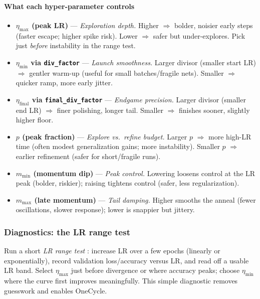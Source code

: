 \begin{enrichment}
	\paragraph{What each hyper-parameter controls}
	\begin{itemize}
		\item \textbf{$\eta_{\text{max}}$ (peak LR)} — \emph{Exploration depth.} Higher $\Rightarrow$ bolder, noisier early steps (faster escape; higher spike risk). Lower $\Rightarrow$ safer but under-explores. Pick just \emph{before} instability in the range test.
		\item \textbf{$\eta_{\text{min}}$ via \texttt{div\_factor}} — \emph{Launch smoothness.} Larger divisor (smaller start LR) $\Rightarrow$ gentler warm-up (useful for small batches/fragile nets). Smaller $\Rightarrow$ quicker ramp, more early jitter.
		\item \textbf{$\eta_{\text{final}}$ via \texttt{final\_div\_factor}} — \emph{Endgame precision.} Larger divisor (smaller end LR) $\Rightarrow$ finer polishing, longer tail. Smaller $\Rightarrow$ finishes sooner, slightly higher floor.
		\item \textbf{$p$ (peak fraction)} — \emph{Explore vs.\ refine budget.} Larger $p$ $\Rightarrow$ more high-LR time (often modest generalization gains; more instability). Smaller $p$ $\Rightarrow$ earlier refinement (safer for short/fragile runs).
		\item \textbf{$m_{\text{min}}$ (momentum dip)} — \emph{Peak control.} Lowering loosens control at the LR peak (bolder, riskier); raising tightens control (safer, less regularization).
		\item \textbf{$m_{\text{max}}$ (late momentum)} — \emph{Tail damping.} Higher smooths the anneal (fewer oscillations, slower response); lower is snappier but jittery.
	\end{itemize}
	
	\subsubsection{Diagnostics: the LR range test}
	\label{enr:subsubsec_chapter10_onecycle_diagnostics}
	Run a short \emph{LR range test} \cite{smith2017_clr}: increase LR over a few epochs (linearly or exponentially), record validation loss/accuracy versus LR, and read off a usable LR band. Select $\eta_{\text{max}}$ just before divergence or where accuracy peaks; choose $\eta_{\text{min}}$ where the curve first improves meaningfully. This simple diagnostic removes guesswork and enables OneCycle.
	

\end{enrichment}
